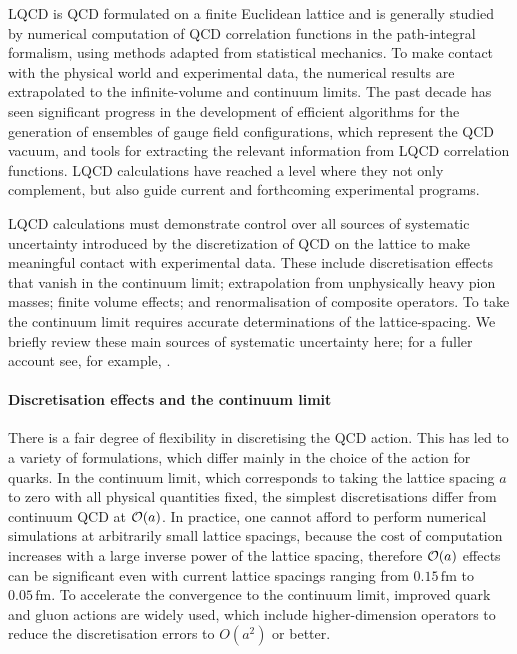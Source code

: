 LQCD is QCD formulated on a finite Euclidean lattice and is generally
studied by numerical computation of QCD correlation functions in the
path-integral formalism, using methods adapted from statistical
mechanics. To make contact with the physical world and experimental
data, the numerical results are extrapolated to the infinite-volume
and continuum limits. The past decade has seen significant progress in
the development of efficient algorithms for the generation of
ensembles of gauge field configurations, which represent the QCD
vacuum, and tools for extracting the relevant information from LQCD
correlation functions. LQCD calculations have reached a level where
they not only complement, but also guide current and forthcoming
experimental programs.

LQCD calculations must demonstrate control over all sources of
systematic uncertainty introduced by the discretization of QCD on the
lattice to make meaningful contact with experimental data. These
include discretisation effects that vanish in the continuum limit;
extrapolation from unphysically heavy pion masses; finite volume
effects; and renormalisation of composite operators. To take the 
continuum limit requires accurate determinations of the lattice-spacing. 
We briefly review these main sources of systematic
uncertainty here; for a fuller account see, for
example, \cite{Aoki:2016frl}.

\paragraph{Discretisation effects and the continuum limit} There is 
a fair degree of flexibility in discretising the QCD action. This has
led to a variety of formulations, which differ mainly in the choice of
the action for quarks. In the continuum limit, which corresponds to taking
the lattice spacing $a$ to zero with all physical quantities fixed,
the simplest discretisations differ from continuum QCD at ${\cal
O}(a)$. In practice, one cannot afford to perform numerical
simulations at arbitrarily small lattice spacings, because the cost of
computation increases with a large inverse power of the lattice
spacing, therefore ${\cal O}(a)$ effects can be significant even
with current lattice spacings ranging from $0.15 \,\mbox{fm}$ to
$0.05 \,\mbox{fm}$. To accelerate the convergence to the continuum
limit, improved quark and gluon actions are widely used, which include
higher-dimension operators to reduce the discretisation errors to
$O(a^2)$ or better.

